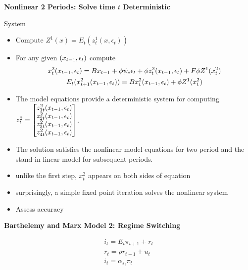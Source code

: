 \documentclass[12pt]{article}
\begin{document}
  {\bf Nonlinear 2 Periods: Solve time $t$ Deterministic

    System }
{\small
  \begin{itemize}
  \item Compute $Z^1(x)= E_t(z^1_t(x,\epsilon_t))$
  \item For any given $(x_{t-1},\epsilon_t)$ 
compute
{\small
  \begin{gather}
    x_t^2(x_{t-1},\epsilon_t)=B x_{t-1} + \phi \psi_e\epsilon_t + \phi z^2_t(x_{t-1},\epsilon_t) + F \phi Z^1(x^2_t) \label{bothS}\\
    E_t(x^2_{t+1}(x_{t-1},\epsilon_t))=B x^2_{t}(x_{t-1},\epsilon_t)+ \phi Z^1(x^2_t)
  \end{gather}
}
\item The model equations provide a deterministic system  for computing $  z^2_t=\begin{bmatrix}
    z^2_{1t}(x_{t-1},\epsilon_t)\\
    z^2_{2t}(x_{t-1},\epsilon_t)\\
    z^2_{3t}(x_{t-1},\epsilon_t)\\
    z^2_{4t}(x_{t-1},\epsilon_t)
  \end{bmatrix}$.
\item The solution satisfies the nonlinear model equations for two 
period and the stand-in linear model for subsequent periods.
\item unlike the first step, $x^2_t$ appears on both sides of equation 
\item  surprisingly, a simple fixed point iteration solves the nonlinear system
\item Assess accuracy
  \end{itemize}
}









  {\bf Barthelemy and Marx  Model 2: Regime Switching

\cite{marxbarthelemy2012}}


\cite{troy2007}
\begin{gather}
  \label{eq:4}
  i_t =E_t \pi_{t+1} + r_t\\
r_t= \rho r_{t-1} +u_t\\
i_t=\alpha_{s_t} \pi_t
\end{gather}
\end{document}
